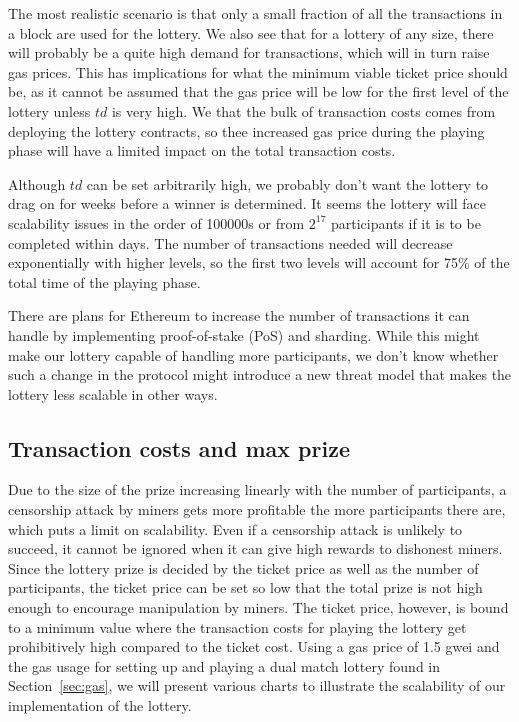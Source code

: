 The most realistic scenario is that only a small fraction of all the transactions in a block are used for the lottery. We also see that for a lottery of any size, there will probably be a quite high demand for transactions, which will in turn raise gas prices. This has implications for what the minimum viable ticket price should be, as it cannot be assumed that the gas price will be low for the first level of the lottery unless $td$ is very high. We that the bulk of transaction costs comes from deploying the lottery contracts, so thee increased gas price during the playing phase will have a limited impact on the total transaction costs.

Although $td$ can be set arbitrarily high, we probably don't want the lottery to drag on for weeks before a winner is determined. It seems the lottery will face scalability issues in the order of 100000s or from $2^{17}$ participants if it is to be completed within days. The number of transactions needed will decrease exponentially with higher levels, so the first two levels will account for 75\% of the total time of the playing phase. 

There are plans for Ethereum to increase the number of transactions it can handle by implementing proof-of-stake (PoS) and sharding. While this might make our lottery capable of handling more participants, we don't know whether such a change in the protocol might introduce a new threat model that makes the lottery less scalable in other ways.

\subsection{Transaction costs and max prize}

Due to the size of the prize increasing linearly with the number of participants, a censorship attack by miners gets more profitable the more participants there are, which puts a limit on scalability. Even if a censorship attack is unlikely to succeed, it cannot be ignored when it can give high rewards to dishonest miners. Since the lottery prize is decided by the ticket price as well as the number of participants, the ticket price can be set so low that the total prize is not high enough to encourage manipulation by miners. The ticket price, however, is bound to a minimum value where the transaction costs for playing the lottery get prohibitively high compared to the ticket cost. Using a gas price of 1.5 gwei and the gas usage for setting up and playing a dual match lottery found in Section~\ref{sec:gas}, we will present various charts to illustrate the scalability of our implementation of the lottery.

